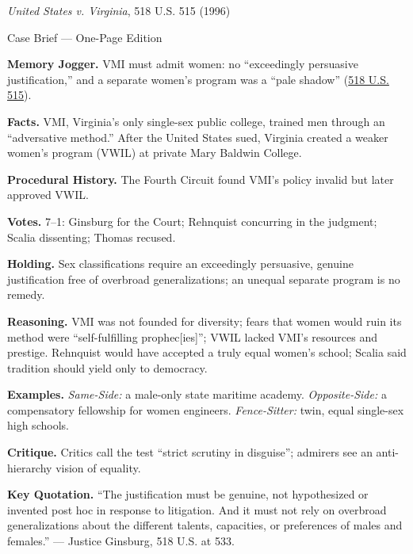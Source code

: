 \documentclass[12pt]{article}
\begin{document}
\begin{center}
{\Large \textit{United States v. Virginia}, 518 U.S. 515 (1996)\par}
\vspace{0.3em}
{\normalsize Case Brief --- One-Page Edition\par}
\end{center}

\textbf{Memory Jogger.} VMI must admit women: no ``exceedingly persuasive justification,'' and a separate women's program was a ``pale shadow'' (\href{https://supreme.justia.com/cases/federal/us/518/515/}{518 U.S. 515}).

\textbf{Facts.} VMI, Virginia's only single-sex public college, trained men through an ``adversative method.'' After the United States sued, Virginia created a weaker women's program (VWIL) at private Mary Baldwin College.

\textbf{Procedural History.} The Fourth Circuit found VMI's policy invalid but later approved VWIL.

\textbf{Votes.} 7--1: Ginsburg for the Court; Rehnquist concurring in the judgment; Scalia dissenting; Thomas recused.

\textbf{Holding.} Sex classifications require an exceedingly persuasive, genuine justification free of overbroad generalizations; an unequal separate program is no remedy.

\textbf{Reasoning.} VMI was not founded for diversity; fears that women would ruin its method were ``self-fulfilling prophec[ies]''; VWIL lacked VMI's resources and prestige. Rehnquist would have accepted a truly equal women's school; Scalia said tradition should yield only to democracy.

\textbf{Examples.} \emph{Same-Side:} a male-only state maritime academy. \emph{Opposite-Side:} a compensatory fellowship for women engineers. \emph{Fence-Sitter:} twin, equal single-sex high schools.

\textbf{Critique.} Critics call the test ``strict scrutiny in disguise''; admirers see an anti-hierarchy vision of equality.

\textbf{Key Quotation.} ``The justification must be genuine, not hypothesized or invented post hoc in response to litigation. And it must not rely on overbroad generalizations about the different talents, capacities, or preferences of males and females.'' --- Justice Ginsburg, 518 U.S. at 533.
\end{document}
